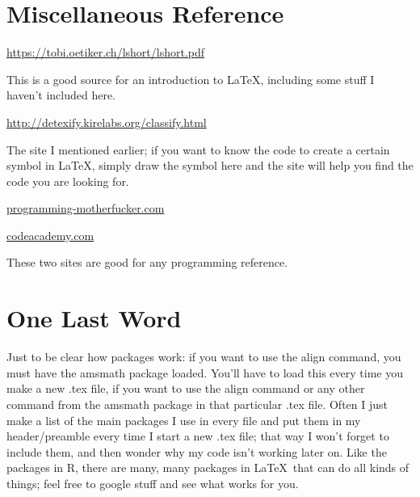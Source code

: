 \documentclass{article}
\begin{document}
\section{Miscellaneous Reference}
\flushleft
\url{https://tobi.oetiker.ch/lshort/lshort.pdf}

This is a good source for an introduction to \LaTeX, including some stuff I haven't included here. 

\url{http://detexify.kirelabs.org/classify.html}

The site I mentioned earlier; if you want to know the code to create a certain symbol in \LaTeX, simply draw the symbol here and the site will help you find the code you are looking for. 

\url{programming-motherfucker.com}

\url{codeacademy.com}

These two sites are good for any programming reference.


\section{One Last Word}
Just to be clear how packages work: if you want to use the align command, you must have the amsmath package loaded. You'll have to load this every time you make a new .tex file, if you want to use the align command or any other command from the amsmath package in that particular .tex file. Often I just make a list of the main packages I use in every file and put them in my header/preamble every time I start a new .tex file; that way I won't forget to include them, and then wonder why my code isn't working later on. Like the packages in R, there are many, many packages in \LaTeX~that can do all kinds of things; feel free to google stuff and see what works for you.
\end{document}

